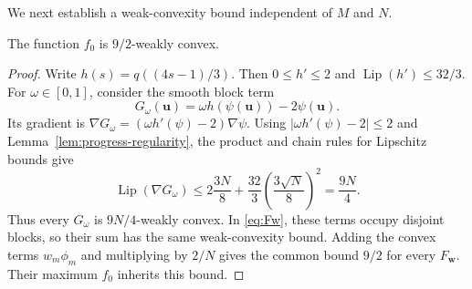 We next establish a weak-convexity bound independent of $M$ and $N$.
\begin{lemma}
\label{lem:coupled-curvature}
The function $f_0$ is $9/2$-weakly convex.
\end{lemma}
\begin{proof}
Write $h(s)=q((4s-1)/3)$. Then $0\le h'\le2$ and
$\operatorname{Lip}(h')\le32/3$.
For $\omega\in[0,1]$, consider the smooth block term
\[
 G_\omega(\bm u)=\omega h(\psi(\bm u))-2\psi(\bm u).
\]
Its gradient is
$\nabla G_\omega=(\omega h'(\psi)-2)\nabla\psi$.
Using $|\omega h'(\psi)-2|\le2$ and
Lemma~\ref{lem:progress-regularity}, the product and chain rules
for Lipschitz bounds give
\[
 \operatorname{Lip}(\nabla G_\omega)
 \le 2\frac{3N}{8}
    +\frac{32}{3}\left(\frac{3\sqrt N}{8}\right)^2
 =\frac{9N}{4}.
\]
Thus every $G_\omega$ is $9N/4$-weakly convex.
In \eqref{eq:Fw}, these terms occupy disjoint blocks, so their
sum has the same weak-convexity bound. Adding the convex terms
$w_m\phi_m$ and multiplying by $2/N$ gives the common bound
$9/2$ for every $F_{\bm w}$. Their maximum $f_0$ inherits this bound.
\end{proof}



